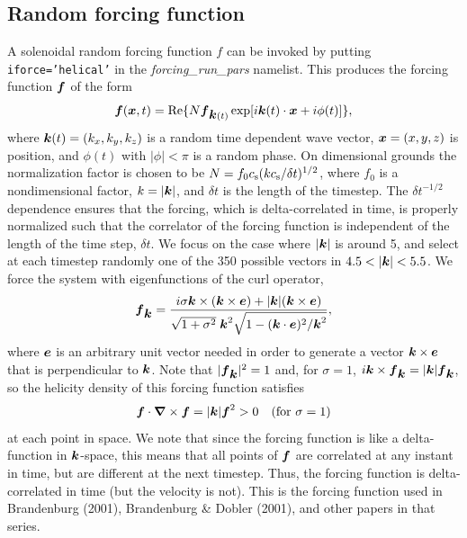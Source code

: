 \documentclass[\mydriver,12pt,twoside,notitlepage,a4paper]{article}
\makeatletter
\newcommand{\code}[1]{\texttt{#1}}
\newcommand{\name}[2][]{%
  \def\index@{#1}%
  \textsl{#2\/}%
  \ifx\index@\@empty\index{#2@\MakeUppercase #2}%
  \else\index{#1}%
  \fi%
}
\renewcommand{\vec}[1]{\mbox{\boldmath{$#1$}}}
\newcommand{\ev}            {\vec{e}}
\newcommand{\fv}            {\vec{f}}
\newcommand{\kv}            {\vec{k}}
\newcommand{\xv}            {\vec{x}}
\newcommand{\nab}{\mbox{\boldmath $\nabla$} {}}
\makeatother
\begin{document}

\subsection{Random forcing function}
\label{SRandomForcingFunction}

A solenoidal random forcing function $f$ can be invoked by putting
\code{iforce='helical'} in the \name{forcing_run_pars} namelist.
This produces the forcing function $\fv$ of the form
\begin{equation}
\fv(\xv,t)=\mbox{Re}\{N\fv_{\kv(t)}\exp[i\kv(t)\cdot\xv+i\phi(t)]\},
\end{equation}
where $\kv(t)=(k_x,k_y,k_z)$ is a random time dependent wave vector,
$\xv=(x,y,z)$ is position, and $\phi(t)$ with $|\phi|<\pi$ is
a random phase. On dimensional grounds the normalization factor
is chosen to be
$N=f_0 c_{\rm s}(kc_{\rm s}/\delta t)^{1/2}$, where $f_0$ is a
nondimensional factor, $k=|\kv|$, and $\delta t$ is the length of
the timestep.
The $\delta t^{-1/2}$ dependence ensures that the forcing,
which is delta-correlated in time, is properly normalized such
that the correlator of the forcing function is independent of the
length of the time step, $\delta t$.
We focus on the case where $|\kv|$ is around 5, and
select at each timestep randomly one of the 350 possible vectors in
$4.5<|\kv|<5.5$. We force the system with eigenfunctions of the curl
operator,
\begin{equation}
\fv_{\kv}={i\sigma \kv\times(\kv\times\ev) +|\kv|(\kv\times\ev)
\over\sqrt{1+\sigma^2}\;\kv^2\sqrt{1-(\kv\cdot\ev)^2/\kv^2}},
\end{equation}
where $\ev$ is an arbitrary unit vector needed in order
to generate a vector $\kv\times\ev$ that is perpendicular
to $\kv$. Note that $|\fv_{\kv}|^2=1$ and, for $\sigma=1$,
$i\kv\times\fv_{\kv}=|\kv|\fv_{\kv}$, so the helicity density of this
forcing function satisfies
\begin{equation}
\fv\cdot\nab\times\fv=|\kv|\fv^2>0\quad(\mbox{for $\sigma=1$})
\end{equation}
at each point in space. We note that since the forcing function is like
a delta-function in $\kv$-space, this means that all points of $\fv$
are correlated at any instant in time, but are different at the next
timestep. Thus, the forcing function is delta-correlated in time (but
the velocity is not). This is the forcing function used in Brandenburg
(2001), Brandenburg \& Dobler (2001), and other papers in that series.
\end{document}
